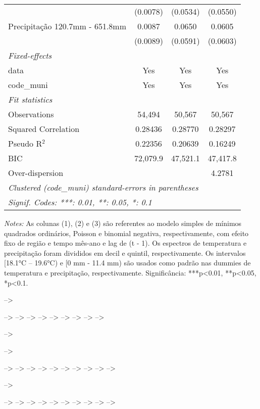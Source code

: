 \documentclass[
]{article}
\begin{document}
\begin{table}[htbp]
\begin{tabular}{lccc}
  &(0.0078) & (0.0534) & (0.0550)\\
Precipitação 120.7mm - 651.8mm & 0.0087 & 0.0650 & 0.0605\\
  &(0.0089) & (0.0591) & (0.0603)\\
\midrule \emph{Fixed-effects}&   &   &  \\
data & Yes & Yes & Yes\\
code\_muni & Yes & Yes & Yes\\
\midrule \emph{Fit statistics}&  & & \\
Observations & 54,494&50,567&50,567\\
Squared Correlation & 0.28436&0.28770&0.28297\\
Pseudo R$^2$ & 0.22356&0.20639&0.16249\\
BIC & 72,079.9&47,521.1&47,417.8\\
Over-dispersion & &&4.2781\\
\midrule\midrule\multicolumn{4}{l}{\emph{Clustered (code\_muni) standard-errors in parentheses}}\\
\multicolumn{4}{l}{\emph{Signif. Codes: ***: 0.01, **: 0.05, *: 0.1}}\\
\end{tabular}

\medskip \emph{Notes:} As colunas (1), (2) e (3) são referentes ao modelo simples de mínimos quadrados ordinários, Poisson e binomial negativa, respectivamente, com efeito fixo de região e tempo mês-ano e lag de (t - 1). Os espectros de temperatura e precipitação foram divididos em decil e quintil, respectivamente. Os intervalos [18.1°C – 19.6°C) e [0 mm - 11.4 mm) são usados como padrão nas dummies de temperatura e precipitação, respectivamente. Significância: ***p<0.01, **p<0.05, *p<0.1.
\end{table}

--\textgreater{}

--\textgreater{} --\textgreater{} --\textgreater{} --\textgreater{}
--\textgreater{} --\textgreater{} --\textgreater{} --\textgreater{}
--\textgreater{}

--\textgreater{}

--\textgreater{}

--\textgreater{} --\textgreater{} --\textgreater{} --\textgreater{}
--\textgreater{} --\textgreater{} --\textgreater{} --\textgreater{}
--\textgreater{} --\textgreater{}

--\textgreater{}

--\textgreater{} --\textgreater{} --\textgreater{} --\textgreater{}
--\textgreater{} --\textgreater{} --\textgreater{} --\textgreater{}
--\textgreater{} --\textgreater{}
\end{document}
